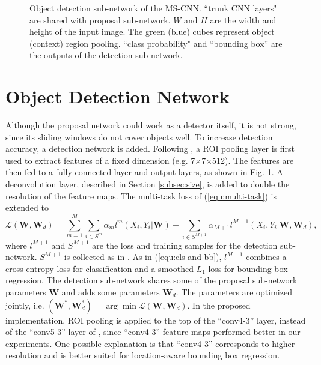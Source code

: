 \documentclass[runningheads]{llncs}
\begin{document}
\begin{figure}[!t]
\centering
\centerline{}
\caption{Object detection sub-network of the MS-CNN. ``trunk CNN layers" are shared with proposal sub-network. $W$ and $H$ are the
width and height of the input image. The green (blue) cubes represent
object (context) region pooling. ``class probability" and ``bounding box'' are the outputs of the detection sub-network.}
\label{fig:frcnn}
\end{figure}


\section{Object Detection Network}

Although the proposal network could work as a detector itself, it is not
strong, since its sliding windows do not cover objects well. To increase detection accuracy, a detection network is added.
Following \cite{DBLP:conf/iccv/Girshick15}, a ROI pooling layer is first used to extract features of a fixed dimension (e.g. 7$\times$7$\times$512). The
features are then fed to a fully connected layer and output layers, as
shown in Fig. \ref{fig:frcnn}. A deconvolution layer,  described in
Section \ref{subsec:size}, is added to double the resolution of the feature
maps. The multi-task loss of (\ref{equ:multi-task}) is extended to
\begin{equation}
\mathcal{L}(\textbf{W},\textbf{W}_d)
=\sum_{m=1}^{M}\sum_{i\in{S^m}}\alpha_{m}l^{m}(X_i,Y_i|\textbf{W})
+\sum_{i\in{S^{M+1}}}\alpha_{M+1}l^{M+1}(X_i,Y_i|\textbf{W},\textbf{W}_d),
\label{equ:gross loss}
\end{equation}
where $l^{M+1}$ and $S^{M+1}$ are the loss and training samples for the
detection sub-network. $S^{M+1}$ is collected as
in \cite{DBLP:conf/iccv/Girshick15}. As in (\ref{equ:cls and bb}), $l^{M+1}$
combines a cross-entropy loss for classification and a smoothed $L_1$ loss
for bounding box regression. The detection sub-network shares some of the
proposal sub-network parameters $\textbf{W}$ and adds some
parameters $\textbf{W}_d$. The parameters are optimized jointly,
i.e.
$(\textbf{W}^*,\textbf{W}_d^*)=\arg\min\mathcal{L}(\textbf{W},\textbf{W}_d)$.
In the proposed implementation, ROI pooling is applied to the top of
the ``conv4-3'' layer, instead of the ``conv5-3'' layer of
\cite{DBLP:conf/iccv/Girshick15}, since ``conv4-3'' feature maps
performed better in our experiments. One possible explanation is that
``conv4-3'' corresponds to higher resolution and is better suited for
location-aware bounding box regression.
\end{document}
